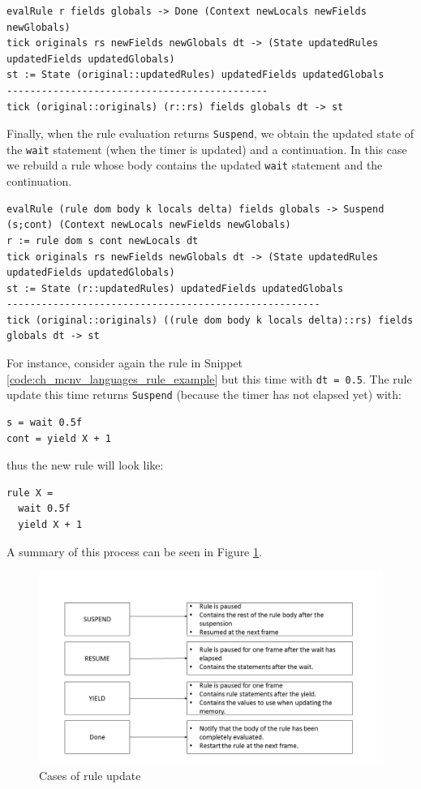 \begin{lstlisting}
evalRule r fields globals -> Done (Context newLocals newFields newGlobals)
tick originals rs newFields newGlobals dt -> (State updatedRules updatedFields updatedGlobals)
st := State (original::updatedRules) updatedFields updatedGlobals
---------------------------------------------
tick (original::originals) (r::rs) fields globals dt -> st
\end{lstlisting}

\noindent
Finally, when the rule evaluation returns \texttt{Suspend}, we obtain the updated state of the \texttt{wait} statement (when the timer is updated) and a continuation. In this case we rebuild a rule whose body contains the updated \texttt{wait} statement and the continuation. 

\begin{lstlisting}
evalRule (rule dom body k locals delta) fields globals -> Suspend (s;cont) (Context newLocals newFields newGlobals)
r := rule dom s cont newLocals dt
tick originals rs newFields newGlobals dt -> (State updatedRules updatedFields updatedGlobals)
st := State (r::updatedRules) updatedFields updatedGlobals
------------------------------------------------------
tick (original::originals) ((rule dom body k locals delta)::rs) fields globals dt -> st
\end{lstlisting}

\noindent
For instance, consider again the rule in Snippet \ref{code:ch_mcnv_languages_rule_example} but this time with \texttt{dt = 0.5}. The rule update this time returns \texttt{Suspend} (because the timer has not elapsed yet) with:

\begin{lstlisting}
s = wait 0.5f
cont = yield X + 1
\end{lstlisting} 

\noindent
thus the new rule will look like:

\begin{lstlisting}
rule X =
  wait 0.5f
  yield X + 1
\end{lstlisting}

\noindent
A summary of this process can be seen in Figure \ref{fig:ch_mcnv_languages_tick}.

\begin{figure}
	\centering
	\includegraphics[width=\textwidth]{Figures/tick2}
	\caption{Cases of rule update}
	\label{fig:ch_mcnv_languages_tick}
\end{figure}


